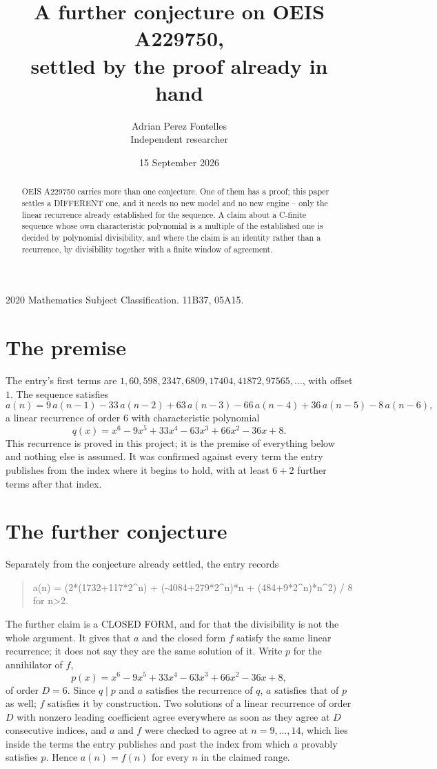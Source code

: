 \documentclass[11pt,a4paper]{article}
\title{A further conjecture on OEIS A229750,\\ \large settled by the proof already in hand}
\author{Adrian Perez Fontelles\\ \small Independent researcher}
\date{15 September 2026}
\theoremstyle{plain}
\theoremstyle{definition}
\begin{document}
\maketitle

\begin{abstract}
OEIS A229750 carries more than one conjecture. One of them has a proof; this paper settles a
DIFFERENT one, and it needs no new model and no new engine -- only the linear recurrence already
established for the sequence. A claim about a C-finite sequence whose own characteristic
polynomial is a multiple of the established one is decided by polynomial divisibility, and where
the claim is an identity rather than a recurrence, by divisibility together with a finite window
of agreement.
\end{abstract}

\noindent\small 2020 Mathematics Subject Classification. 11B37, 05A15.\normalsize

\section{The premise}

The entry's first terms are $1, 60, 598, 2347, 6809, 17404, 41872, 97565,\dots$, with offset $1$. The sequence satisfies
\[
  a(n)=9\,a(n-1) - 33\,a(n-2) + 63\,a(n-3) - 66\,a(n-4) + 36\,a(n-5) - 8\,a(n-6) ,
\]
a linear recurrence of order $6$ with characteristic polynomial
\[
  q(x)=x^{6} - 9 x^{5} + 33 x^{4} - 63 x^{3} + 66 x^{2} - 36 x + 8 .
\]
This recurrence is proved in this project; it is the premise of everything below and nothing else is assumed.
It was confirmed against every term the entry publishes from the index where it begins to hold,
with at least $6+2$ further terms after that index.

\section{The further conjecture}

Separately from the conjecture already settled, the entry records

\begin{quote}\raggedright a(n) = (2*(1732+117*2\^{}n) + (-4084+279*2\^{}n)*n + (484+9*2\^{}n)*n\^{}2) / 8 for n>2.\end{quote}

The further claim is a CLOSED FORM, and for that the divisibility is not the whole argument. It
gives that $a$ and the closed form $f$ satisfy the same linear recurrence; it does not say they
are the same solution of it. Write $p$ for the annihilator of $f$,
\[
  p(x)=x^{6} - 9 x^{5} + 33 x^{4} - 63 x^{3} + 66 x^{2} - 36 x + 8 ,
\]
of order $D=6$. Since $q\mid p$ and $a$ satisfies the recurrence of $q$, $a$ satisfies that of
$p$ as well; $f$ satisfies it by construction. Two solutions of a linear recurrence of order $D$
with nonzero leading coefficient agree everywhere as soon as they agree at $D$ consecutive
indices, and $a$ and $f$ were checked to agree at $n=9,\dots,14$,
which lies inside the terms the entry publishes and past the index from which $a$ provably
satisfies $p$. Hence $a(n)=f(n)$ for every $n$ in the claimed range.
\end{document}

